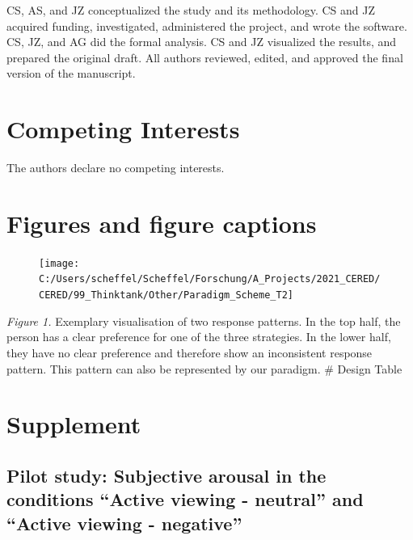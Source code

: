 \documentclass[
  english,
  man,floatsintext]{apa6}
\begin{document}
CS, AS, and JZ conceptualized the study and its methodology.
CS and JZ acquired funding, investigated, administered the project, and wrote the software.
CS, JZ, and AG did the formal analysis.
CS and JZ visualized the results, and prepared the original draft.
All authors reviewed, edited, and approved the final version of the manuscript.

\hypertarget{competing-interests}{%
\section{Competing Interests}\label{competing-interests}}

The authors declare no competing interests.

\newpage
\setcounter{figure}{0}

\hypertarget{figures-and-figure-captions}{%
\section{Figures and figure captions}\label{figures-and-figure-captions}}

\newpage
\begin{figure}
\texttt{[image: C:/Users/scheffel/Scheffel/Forschung/A\_Projects/2021\_CERED/CERED/99\_Thinktank/Other/Paradigm\_Scheme\_T2]} \caption{ }\label{fig:fig1appendix}
\end{figure}

\emph{Figure 1.} Exemplary visualisation of two response patterns. In the top half, the person has a clear preference for one of the three strategies. In the lower half, they have no clear preference and therefore show an inconsistent response pattern. This pattern can also be represented by our paradigm.
\# Design Table



\newpage

\hypertarget{supplement}{%
\section{Supplement}\label{supplement}}



\newpage

\hypertarget{pilot-study-subjective-arousal-in-the-conditions-active-viewing---neutral-and-active-viewing---negative}{%
\subsection{Pilot study: Subjective arousal in the conditions ``Active viewing - neutral'' and ``Active viewing - negative''}\label{pilot-study-subjective-arousal-in-the-conditions-active-viewing---neutral-and-active-viewing---negative}}
\end{document}
